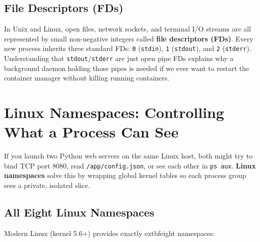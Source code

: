 \subsection{File Descriptors (FDs)}
In Unix and Linux, open files, network sockets, and terminal I/O streams are all represented by small non-negative integers called \textbf{file descriptors (FDs)}. Every new process inherits three standard FDs: \texttt{0} (\texttt{stdin}), \texttt{1} (\texttt{stdout}), and \texttt{2} (\texttt{stderr}). Understanding that \texttt{stdout}/\texttt{stderr} are just open pipe FDs explains why a background daemon holding those pipes is needed if we ever want to restart the container manager without killing running containers.

\section{Linux Namespaces: Controlling What a Process Can See}

If you launch two Python web servers on the same Linux host, both might try to bind TCP port 8080, read \texttt{/app/config.json}, or see each other in \texttt{ps aux}. \textbf{Linux namespaces} solve this by wrapping global kernel tables so each process group sees a private, isolated slice.

\subsection{All Eight Linux Namespaces}
Modern Linux (kernel 5.6+) provides exactly 	extbf{eight} namespaces:

